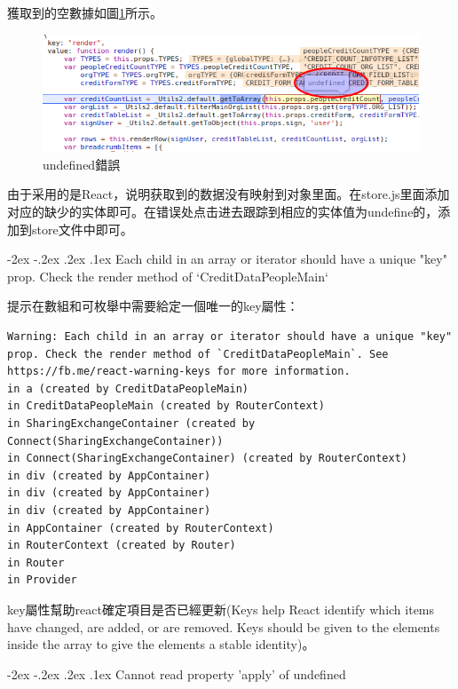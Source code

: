 \documentclass[12pt]{book}
\makeatletter
\numberwithin{dummy}{section}
\theoremstyle{ocrenumbox}
\theoremstyle{blacknumex}
\theoremstyle{blacknumbox}
\theoremstyle{ocrenum}
\renewcommand\paragraph{\@startsection{paragraph}{4}{\z@}
	{-2ex \@plus-.2ex \@minus .2ex}
	{.1ex}
	{\normalfont\small\sffamily\bfseries}}
\makeatother
\begin{document}
獲取到的空數據如圖\ref{fig:getundefineerror}所示。

\begin{figure}[htbp]
	\centering
	\includegraphics[scale=0.5]{getundefineerror.png}
	\caption{undefined錯誤}
	\label{fig:getundefineerror}
\end{figure}

由于采用的是React，说明获取到的数据没有映射到对象里面。在store.js里面添加对应的缺少的实体即可。在错误处点击进去跟踪到相应的实体值为undefine的，添加到store文件中即可。

\paragraph{Each child in an array or iterator should have a unique "key" prop. Check the render method of `CreditDataPeopleMain`}

提示在數組和可枚舉中需要給定一個唯一的key屬性：

\begin{lstlisting}
Warning: Each child in an array or iterator should have a unique "key" prop. Check the render method of `CreditDataPeopleMain`. See https://fb.me/react-warning-keys for more information.
in a (created by CreditDataPeopleMain)
in CreditDataPeopleMain (created by RouterContext)
in SharingExchangeContainer (created by Connect(SharingExchangeContainer))
in Connect(SharingExchangeContainer) (created by RouterContext)
in div (created by AppContainer)
in div (created by AppContainer)
in div (created by AppContainer)
in AppContainer (created by RouterContext)
in RouterContext (created by Router)
in Router
in Provider
\end{lstlisting}

key屬性幫助react確定項目是否已經更新(Keys help React identify which items have changed, are added, or are removed. Keys should be given to the elements inside the array to give the elements a stable identity)。

\paragraph{Cannot read property 'apply' of undefined}
\end{document}
